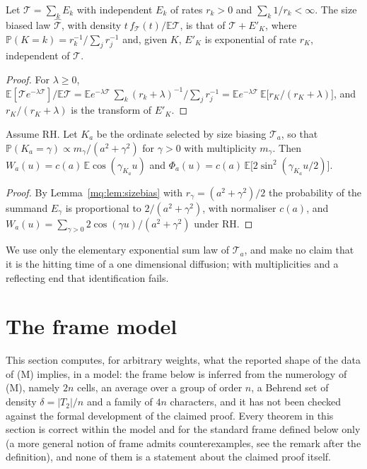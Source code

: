 \begin{lemma}\label{mq:lem:sizebias}
Let $\mathcal T=\sum_kE_k$ with independent $E_k$ of rates $r_k>0$ and $\sum_k1/r_k<\infty$. The size biased law $\hat{\mathcal T}$, with density $t\,f_{\mathcal T}(t)/\mathbb E\mathcal T$, is that of $\mathcal T+E'_K$, where $\mathbb P(K=k)=r_k^{-1}/\sum_jr_j^{-1}$ and, given $K$, $E'_K$ is exponential of rate $r_K$, independent of $\mathcal T$.
\end{lemma}

\begin{proof}
For $\lambda\ge0$, $\mathbb E[\mathcal Te^{-\lambda\mathcal T}]/\mathbb E\mathcal T=\mathbb Ee^{-\lambda\mathcal T}\,\sum_k(r_k+\lambda)^{-1}\big/\sum_jr_j^{-1}=\mathbb Ee^{-\lambda\mathcal T}\,\mathbb E\big[r_K/(r_K+\lambda)\big]$, and $r_K/(r_K+\lambda)$ is the transform of $E'_K$.
\end{proof}

\begin{proposition}\label{mq:prop:sizebias}
Assume RH. Let $K_a$ be the ordinate selected by size biasing $\mathcal T_a$, so that $\mathbb P(K_a=\gamma)\propto m_\gamma/(a^2+\gamma^2)$ for $\gamma>0$ with multiplicity $m_\gamma$. Then $W_a(u)=c(a)\,\mathbb E\cos(\gamma_{K_a}u)$ and $\Phi_a(u)=c(a)\,\mathbb E\big[2\sin^2(\gamma_{K_a}u/2)\big]$.
\end{proposition}

\begin{proof}
By Lemma~\ref{mq:lem:sizebias} with $r_\gamma=(a^2+\gamma^2)/2$ the probability of the summand $E_\gamma$ is proportional to $2/(a^2+\gamma^2)$, with normaliser $c(a)$, and $W_a(u)=\sum_{\gamma>0}2\cos(\gamma u)/(a^2+\gamma^2)$ under RH.
\end{proof}

We use only the elementary exponential sum law of $\mathcal T_a$, and make no claim that it is the hitting time of a one dimensional diffusion; with multiplicities and a reflecting end that identification fails.

\section{The frame model}\label{mq:sec:frame}

This section computes, for arbitrary weights, what the reported shape of the data of (M) implies, in a model: the frame below is inferred from the numerology of (M), namely $2n$ cells, an average over a group of order $n$, a Behrend set of density $\delta=|T_2|/n$ and a family of $4n$ characters, and it has not been checked against the formal development of the claimed proof. Every theorem in this section is correct within the model and for the standard frame defined below only (a more general notion of frame admits counterexamples, see the remark after the definition), and none of them is a statement about the claimed proof itself.

